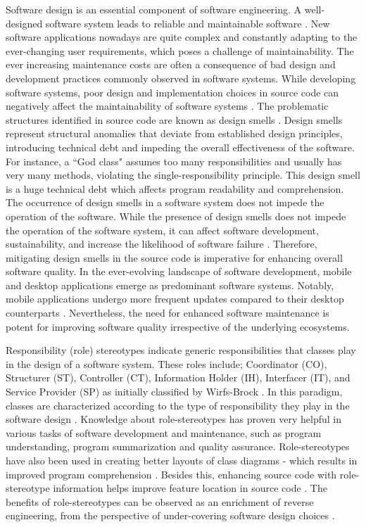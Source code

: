 \documentclass[AMA,Times1COL]{WileyNJDv5} %
\begin{document}
Software design is an essential component of software engineering. A well-designed software system leads to reliable and maintainable software \cite{imran2019design, imran2022qualitative}. New software applications nowadays are quite complex and constantly adapting to the ever-changing user requirements, which poses a challenge of maintainability. The ever increasing maintenance costs \cite{jha2019deep} are often a consequence of bad design and development practices commonly observed in software systems. While developing software systems, poor design and implementation choices in source code can negatively affect the maintainability of software systems \cite{palomba2018diffuseness}. The problematic structures identified in source code are known as design smells \cite{kaur2015influence,aversano2020empirical,imran2022qualitative}. Design smells represent structural anomalies that deviate from established design principles, introducing technical debt and impeding the overall effectiveness of the software. For instance, a ``God class" assumes too many responsibilities and usually has very many methods, violating the single-responsibility principle. This design smell is a huge technical debt which affects program readability and comprehension. The occurrence of design smells in a software system does not impede the operation of the software. While the presence of design smells does not impede the operation of the software system, it can affect software development, sustainability, and increase the likelihood of software failure \cite{turkistani2019reducing}. Therefore, mitigating design smells in the source code is imperative for enhancing overall software quality. In the ever-evolving landscape of software development, mobile and desktop applications emerge as predominant software systems. Notably, mobile applications undergo more frequent updates compared to their desktop counterparts \cite{mcilroy2016fresh}. Nevertheless, the need for enhanced software maintenance is potent for improving software quality irrespective of the underlying ecosystems. 

Responsibility (role) stereotypes indicate generic responsibilities that classes play in the design of a software system. These roles include; Coordinator (CO), Structurer (ST), Controller (CT), Information Holder (IH), Interfacer (IT), and Service Provider (SP) as initially classified by Wirfs-Brock \cite{wirfs2006characterizing}. In this paradigm, classes are characterized according to the type of responsibility they play in the software design \cite{wirfs2006characterizing}. Knowledge about role-stereotypes has proven very helpful in various tasks of software development and maintenance, such as program understanding, program summarization and quality assurance. Role-stereotypes have also been used in creating better layouts of class diagrams - which results in improved program comprehension \cite{genero2008does,nurwidyantoro2019automated, sharif2009effect,ho2022role}.  Besides this, enhancing source code with role-stereotype information helps improve feature location in source code \cite{alhindawi2013improving}. The benefits of role-stereotypes can be observed as an enrichment of reverse engineering, from the perspective of under-covering software design choices \cite{nurwidyantoro2019automated, ho2022role}.
\end{document}
